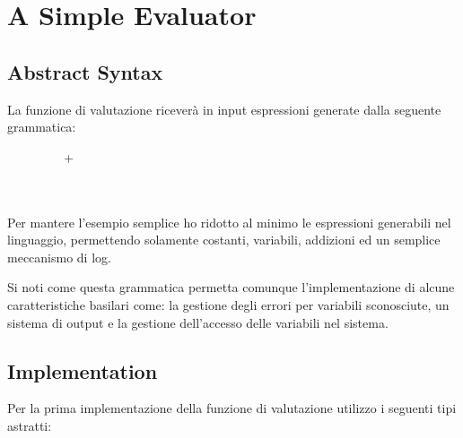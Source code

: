 \section{A Simple Evaluator}
\label{a_simple_evaluator}

\subsection{Abstract Syntax} %
\label{abstract_syntax}

La funzione di valutazione riceverà in input espressioni generate dalla seguente
grammatica:

\begin{figure}[h]
  \centering
  \footnotesize %
  \begin{haskellsyntax}
   \STO {} \ 
            \SOR {} \ 
            \SOR {} + 
            \SOR {} \  \ 
  \\
   
  \\
   \STO {}
  \\
   \STO {}
  \end{haskellsyntax}%

\end{figure}

Per mantere l'esempio semplice ho ridotto al minimo le espressioni generabili
nel linguaggio, permettendo solamente costanti, variabili, addizioni ed un
semplice meccanismo di log.\newline

Si noti come questa grammatica permetta comunque l'implementazione di alcune
caratteristiche basilari come: la gestione degli errori per variabili
sconosciute, un sistema di output e la gestione dell'accesso delle variabili nel
sistema.

\subsection{Implementation} %
\label{implementation}

Per la prima implementazione della funzione di valutazione utilizzo i seguenti
tipi astratti:

